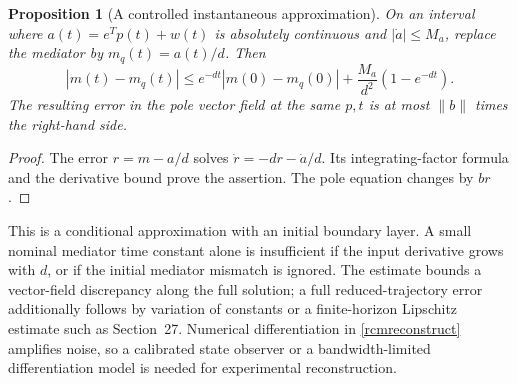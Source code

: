 \documentclass[11pt,letterpaper]{article}
\newtheorem{proposition}[theorem]{Proposition}
\theoremstyle{definition}
\numberwithin{equation}{section}
\begin{document}
\begin{proposition}[A controlled instantaneous approximation]\label{rcquasistatic}
On an interval where $a(t)=e^Tp(t)+w(t)$ is absolutely continuous and $|\dot a|\leq M_a$, replace the mediator by $m_q(t)=a(t)/d$. Then
\begin{equation}\label{rcmemoryerror}
|m(t)-m_q(t)|\leq e^{-dt}|m(0)-m_q(0)|+\frac{M_a}{d^2}(1-e^{-dt}).
\end{equation}
The resulting error in the pole vector field at the same $p,t$ is at most $\|b\|$ times the right-hand side.
\end{proposition}
\begin{proof}
The error $r=m-a/d$ solves $\dot r=-dr-\dot a/d$. Its integrating-factor formula and the derivative bound prove the assertion. The pole equation changes by $br$.
\end{proof}
This is a conditional approximation with an initial boundary layer. A small nominal mediator time constant alone is insufficient if the input derivative grows with $d$, or if the initial mediator mismatch is ignored. The estimate bounds a vector-field discrepancy along the full solution; a full reduced-trajectory error additionally follows by variation of constants or a finite-horizon Lipschitz estimate such as Section~27. Numerical differentiation in \eqref{rcmreconstruct} amplifies noise, so a calibrated state observer or a bandwidth-limited differentiation model is needed for experimental reconstruction.
\end{document}
